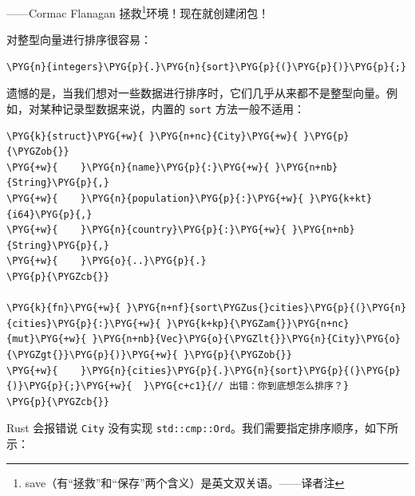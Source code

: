 
\begin{myEpigraph}{——Cormac Flanagan}
拯救\footnote{save（有“拯救”和“保存”两个含义）是英文双关语。——译者注}环境！现在就创建闭包！
\end{myEpigraph}

对整型向量进行排序很容易：

\begin{Verbatim}[commandchars=\\\{\},breaklines=true,breakanywhere=true,fontsize=\codefont,xleftmargin=17bp]
\PYG{n}{integers}\PYG{p}{.}\PYG{n}{sort}\PYG{p}{(}\PYG{p}{)}\PYG{p}{;}
\end{Verbatim}

遗憾的是，当我们想对一些数据进行排序时，它们几乎从来都不是整型向量。例如，对某种记录型数据来说，内置的 \texttt{sort} 方法一般不适用：

\begin{Verbatim}[commandchars=\\\{\},breaklines=true,breakanywhere=true,fontsize=\codefont,xleftmargin=17bp]
\PYG{k}{struct}\PYG{+w}{ }\PYG{n+nc}{City}\PYG{+w}{ }\PYG{p}{\PYGZob{}}
\PYG{+w}{    }\PYG{n}{name}\PYG{p}{:}\PYG{+w}{ }\PYG{n+nb}{String}\PYG{p}{,}
\PYG{+w}{    }\PYG{n}{population}\PYG{p}{:}\PYG{+w}{ }\PYG{k+kt}{i64}\PYG{p}{,}
\PYG{+w}{    }\PYG{n}{country}\PYG{p}{:}\PYG{+w}{ }\PYG{n+nb}{String}\PYG{p}{,}
\PYG{+w}{    }\PYG{o}{..}\PYG{p}{.}
\PYG{p}{\PYGZcb{}}

\PYG{k}{fn}\PYG{+w}{ }\PYG{n+nf}{sort\PYGZus{}cities}\PYG{p}{(}\PYG{n}{cities}\PYG{p}{:}\PYG{+w}{ }\PYG{k+kp}{\PYGZam{}}\PYG{n+nc}{mut}\PYG{+w}{ }\PYG{n+nb}{Vec}\PYG{o}{\PYGZlt{}}\PYG{n}{City}\PYG{o}{\PYGZgt{}}\PYG{p}{)}\PYG{+w}{ }\PYG{p}{\PYGZob{}}
\PYG{+w}{    }\PYG{n}{cities}\PYG{p}{.}\PYG{n}{sort}\PYG{p}{(}\PYG{p}{)}\PYG{p}{;}\PYG{+w}{  }\PYG{c+c1}{// 出错：你到底想怎么排序？}
\PYG{p}{\PYGZcb{}}
\end{Verbatim}

Rust 会报错说 \texttt{City} 没有实现 \texttt{std::cmp::Ord}。我们需要指定排序顺序，如下所示：

